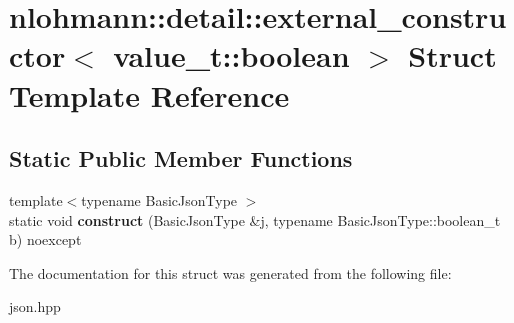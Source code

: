\hypertarget{structnlohmann_1_1detail_1_1external__constructor_3_01value__t_1_1boolean_01_4}{}\section{nlohmann\+:\+:detail\+:\+:external\+\_\+constructor$<$ value\+\_\+t\+:\+:boolean $>$ Struct Template Reference}
\label{structnlohmann_1_1detail_1_1external__constructor_3_01value__t_1_1boolean_01_4}
\subsection*{Static Public Member Functions}
\begin{DoxyCompactItemize}
\item 
\mbox{\label{structnlohmann_1_1detail_1_1external__constructor_3_01value__t_1_1boolean_01_4_a867122bcf0856c757bd6bcbfb8be74bc}} 
{\footnotesize template$<$typename Basic\+Json\+Type $>$ }\\static void {\bfseries construct} (Basic\+Json\+Type \&j, typename Basic\+Json\+Type\+::boolean\+\_\+t b) noexcept
\end{DoxyCompactItemize}


The documentation for this struct was generated from the following file\+:\begin{DoxyCompactItemize}
\item 
json.\+hpp\end{DoxyCompactItemize}

